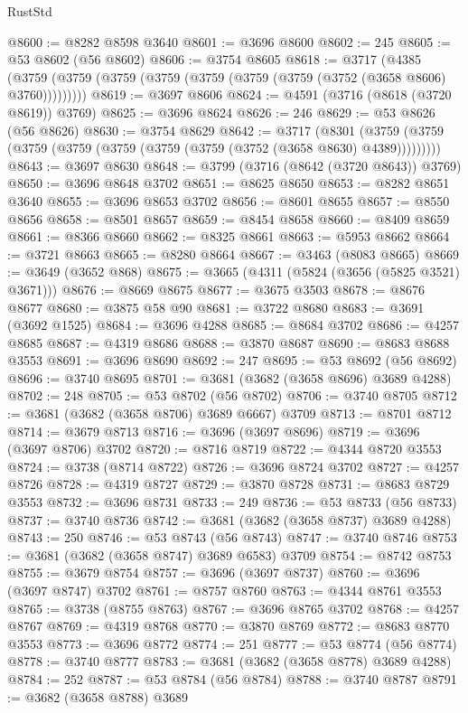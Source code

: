 \begin{lexlean}{RustStd}
\begin{coremodule}
@8600 := @8282 @8598 @3640
@8601 := @3696 @8600
@8602 := 245
@8605 := @53 @8602 (@56 @8602)
@8606 := @3754 @8605
@8618 := @3717
    (@4385 (@3759 (@3759 (@3759 (@3759 (@3759 (@3759 (@3759 (@3752 (@3658 @8606) @3760)))))))))
@8619 := @3697 @8606
@8624 := @4591 (@3716 (@8618 (@3720 @8619)) @3769)
@8625 := @3696 @8624
@8626 := 246
@8629 := @53 @8626 (@56 @8626)
@8630 := @3754 @8629
@8642 := @3717
    (@8301 (@3759 (@3759 (@3759 (@3759 (@3759 (@3759 (@3759 (@3752 (@3658 @8630) @4389)))))))))
@8643 := @3697 @8630
@8648 := @3799 (@3716 (@8642 (@3720 @8643)) @3769)
@8650 := @3696 @8648 @3702
@8651 := @8625 @8650
@8653 := @8282 @8651 @3640
@8655 := @3696 @8653 @3702
@8656 := @8601 @8655
@8657 := @8550 @8656
@8658 := @8501 @8657
@8659 := @8454 @8658
@8660 := @8409 @8659
@8661 := @8366 @8660
@8662 := @8325 @8661
@8663 := @5953 @8662
@8664 := @3721 @8663
@8665 := @8280 @8664
@8667 := @3463 (@8083 @8665)
@8669 := @3649 (@3652 @868)
@8675 := @3665 (@4311 (@5824 (@3656 (@5825 @3521) @3671)))
@8676 := @8669 @8675
@8677 := @3675 @3503
@8678 := @8676 @8677
@8680 := @3875 @58 @90
@8681 := @3722 @8680
@8683 := @3691 (@3692 @1525)
@8684 := @3696 @4288
@8685 := @8684 @3702
@8686 := @4257 @8685
@8687 := @4319 @8686
@8688 := @3870 @8687
@8690 := @8683 @8688 @3553
@8691 := @3696 @8690
@8692 := 247
@8695 := @53 @8692 (@56 @8692)
@8696 := @3740 @8695
@8701 := @3681 (@3682 (@3658 @8696) @3689 @4288)
@8702 := 248
@8705 := @53 @8702 (@56 @8702)
@8706 := @3740 @8705
@8712 := @3681 (@3682 (@3658 @8706) @3689 @6667) @3709
@8713 := @8701 @8712
@8714 := @3679 @8713
@8716 := @3696 (@3697 @8696)
@8719 := @3696 (@3697 @8706) @3702
@8720 := @8716 @8719
@8722 := @4344 @8720 @3553
@8724 := @3738 (@8714 @8722)
@8726 := @3696 @8724 @3702
@8727 := @4257 @8726
@8728 := @4319 @8727
@8729 := @3870 @8728
@8731 := @8683 @8729 @3553
@8732 := @3696 @8731
@8733 := 249
@8736 := @53 @8733 (@56 @8733)
@8737 := @3740 @8736
@8742 := @3681 (@3682 (@3658 @8737) @3689 @4288)
@8743 := 250
@8746 := @53 @8743 (@56 @8743)
@8747 := @3740 @8746
@8753 := @3681 (@3682 (@3658 @8747) @3689 @6583) @3709
@8754 := @8742 @8753
@8755 := @3679 @8754
@8757 := @3696 (@3697 @8737)
@8760 := @3696 (@3697 @8747) @3702
@8761 := @8757 @8760
@8763 := @4344 @8761 @3553
@8765 := @3738 (@8755 @8763)
@8767 := @3696 @8765 @3702
@8768 := @4257 @8767
@8769 := @4319 @8768
@8770 := @3870 @8769
@8772 := @8683 @8770 @3553
@8773 := @3696 @8772
@8774 := 251
@8777 := @53 @8774 (@56 @8774)
@8778 := @3740 @8777
@8783 := @3681 (@3682 (@3658 @8778) @3689 @4288)
@8784 := 252
@8787 := @53 @8784 (@56 @8784)
@8788 := @3740 @8787
@8791 := @3682 (@3658 @8788) @3689

\end{coremodule}
\end{lexlean}
